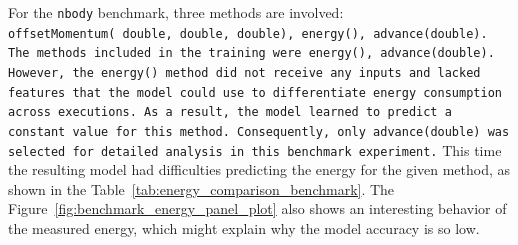 For the \texttt{nbody} benchmark, three methods are involved: \texttt{offsetMomentum(\allowbreak\ double,\allowbreak\ double,\allowbreak\ double),
\texttt{energy()}, \texttt{advance(double)}. The methods included in the training were \texttt{energy()}, \texttt{advance(double)}. However, the \texttt{energy()} method did not receive any inputs and lacked features that the model could use to differentiate energy consumption across executions. As a result, the model learned to predict a constant value for this method. Consequently, only \texttt{advance(double)} was selected for detailed analysis in this benchmark experiment.}
This time the resulting model had difficulties predicting the energy for the given method, as shown in the Table~\ref{tab:energy_comparison_benchmark}. The Figure~\ref{fig:benchmark_energy_panel_plot} also shows an interesting behavior of the measured energy, which might explain why the model accuracy is so low.


\begin{table}[htbp]
  \centering
  \footnotesize
  \setlength{\tabcolsep}{10pt} 
  \caption{Comparison of actual and predicted energy consumption for nBody, fannkuch and spectralnorm program}
  \label{tab:energy_comparison_benchmark}
\end{table}


